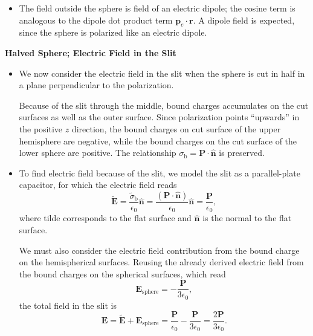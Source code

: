 \documentclass[11pt, a4paper]{article}
\renewcommand{\vec}[1]{\bm{#1}} %
\newcommand{\uvec}[1]{\hat{\vec{#1}}} %
\renewcommand{\t}[1]{\tilde{#1}} %
\renewcommand{\r}{\vec{r}}
\newcommand{\E}{\vec{E}}  %
\newcommand{\ee}{\epsilon_{0}}  %
\newcommand{\pe}{\vec{p}_{e}}  %
\renewcommand{\P}{\vec{P}}  %
\begin{document}
\begin{itemize}
	\item The field outside the sphere is field of an electric dipole; the cosine term is analogous to the dipole dot product term $ \pe \cdot \r $. A dipole field is expected, since the sphere is polarized like an electric dipole. 
	
\end{itemize}

\textbf{Halved Sphere; Electric Field in the Slit}
\begin{itemize}
	\item We now consider the electric field in the slit when the sphere is cut in half in a plane perpendicular to the polarization. 
	
	Because of the slit through the middle, bound charges accumulates on the cut surfaces as well as the outer surface. Since polarization points ``upwards'' in the positive $ z $ direction, the bound charges on cut surface of the upper hemisphere are negative, while the bound charges on the cut surface of the lower sphere are positive. The relationship $ \sigma_{\text{b}} = \P \cdot \uvec{n} $ is preserved. 
	
	\item To find electric field because of the slit, we model the slit as a parallel-plate capacitor, for which the electric field reads
	\begin{equation*}
        \t{\E} = \frac{\t{\sigma}_{\text{b}}}{\ee}\uvec{n} = \frac{(\P \cdot \uvec{n})}{\ee} \uvec{n} = \frac{\P}{\ee},
	\end{equation*}
	where tilde corresponds to the flat surface and $ \uvec{n} $ is the normal to the flat surface.
	
	We must also consider the electric field contribution from the bound charge on the hemispherical surfaces. Reusing the already derived electric field from the bound charges on the spherical surfaces, which read
	\begin{equation*}
		\E_{\text{sphere}} = - \frac{\P}{3\ee},
	\end{equation*}
	the total field in the slit is
	\begin{equation*}
		\E = \t{\E} + \E_{\text{sphere}} = \frac{\P}{\ee} - \frac{\P}{3\ee} = \frac{2\P}{3\ee}.
	\end{equation*}
\end{itemize}
\end{document}
